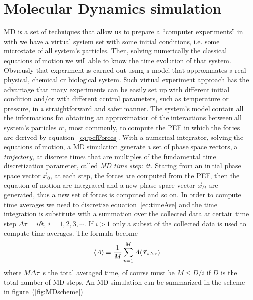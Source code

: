\section{Molecular Dynamics simulation}
\acf{MD} is a set of techniques that allow us to prepare a ``computer experiments'' in with we have a virtual system set with some initial conditions, i.e. some microstate of all system's particles. Then, solving numerically the classical equations of motion we will able to know the time evolution of that system. Obviously that experiment is carried out using a model that approximates a real physical, chemical or biological system. Such virtual experiment approach has the advantage that many experiments can be easily set up with different initial condition and/or with different control parameters, such as temperature or pressure, in a straightforward and safer manner. The system's model contain all the informations for obtaining an approximation of the interactions between all system's particles or, most commonly, to compute the \ac{PEF} in which the forces are derived by equation~\eqref{eq:pefForces}. With a numerical integrator, solving the equations of motion, a \ac{MD} simulation generate a set of phase space vectors, a \textit{trajectory}, at discrete times that are multiples of the fundamental time discretization parameter, called \textit{MD time step}: $\delta t$. Staring from an initial phase space vector $\vec x_0$, at each step, the forces are computed from the \ac{PEF}, then the equation of motion are integrated and a new phase space vector $\vec x_{\delta t}$ are generated, thus a new set of forces is computed and so on. In order to compute time averages we need to discretize equation~\eqref{eq:timeAve} and the time integration is substitute with a summation over the collected data at certain time step $\Delta \tau = i \delta t$, $i=1,2,3,\cdots$. If $i > 1$ only a subset of the collected data is used to compute time averages. The formula become
\begin{equation}
	\langle A \rangle = \frac{1}{M}\sum_{n=1}^M A(\vec x_{n\Delta \tau})
	\label{eq:MDTimeAve}
\end{equation}
where $M\Delta \tau$ is the total averaged time, of course must be $M \le D/i$ if $D$ is the total number of \ac{MD} steps. An \ac{MD} simulation can be summarized in the scheme in figure~(\ref{fig:MDscheme}).
